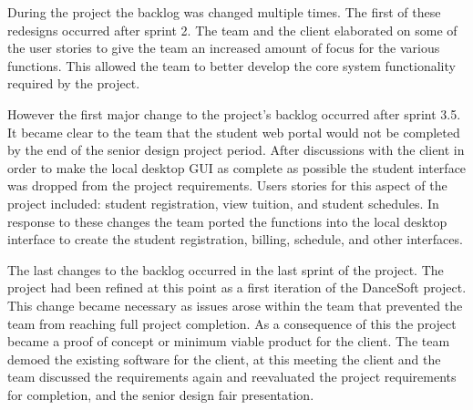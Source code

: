 During the project the backlog was changed multiple times. The first of these redesigns occurred after sprint 2. The team and the client elaborated on some of the user stories to give the team an increased amount of focus for the various functions. This allowed the team to better develop the core system functionality required by the project.

However the first major change to the project's backlog occurred after sprint 3.5. It became clear to the team that the student web portal would not be completed by the end of the senior design project period. After discussions with the client in order to make the local desktop GUI as complete as possible the student interface was dropped from the project requirements. Users stories for this aspect of the project included: student registration, view tuition, and student schedules. In response to these changes the team ported the functions into the local desktop interface to create the student registration, billing, schedule, and other interfaces.

The last changes to the backlog occurred in the last sprint of the project. The project had been refined at this point as a first iteration of the DanceSoft project. This change became necessary as issues arose within the team that prevented the team from reaching full project completion. As a consequence of this the project became a proof of concept or minimum viable product for the client. The team demoed the existing software for the client, at this meeting the client and the team discussed the requirements again and reevaluated the project requirements for completion, and the senior design fair presentation. 

